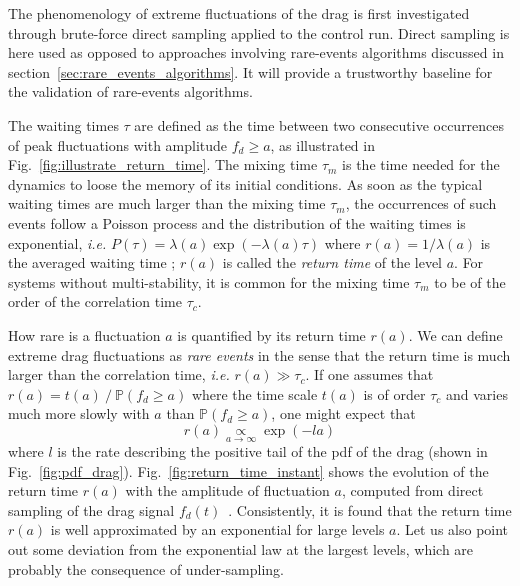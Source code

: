 \documentclass{jfm}
\begin{document}
%
The phenomenology of extreme fluctuations of the drag is first investigated through brute-force direct sampling applied to the control run.
Direct sampling is here used as opposed to approaches involving rare-events algorithms discussed in section~\ref{sec:rare_events_algorithms}.
It will provide a trustworthy baseline for the validation of rare-events algorithms. 

The waiting times $\tau$ are defined as the time between two consecutive occurrences of peak fluctuations with amplitude $f_d \geq a$, as illustrated in Fig.~\ref{fig:illustrate_return_time}.
The mixing time $\tau_m$ is the time needed for the dynamics to loose the memory of its initial conditions.
As soon as the typical waiting times are much larger than the mixing time $\tau_m$, the occurrences of such events follow a Poisson process and the distribution of the waiting times is exponential, \emph{i.e.} $P(\tau)=\lambda(a)\exp(-\lambda(a)\tau)$ where $r(a)=1/\lambda(a)$ is the averaged waiting time \citep{lestang_computing_2018}; $r(a)$ is called the {\it return time} of the level $a$.
For systems without multi-stability, it is common for the mixing time $\tau_m$ to be of the order of the correlation time $\tau_c$.

How rare is a fluctuation $a$ is quantified by its return time $r(a)$.
We can define extreme drag fluctuations as \textit{rare events} in the sense that the return time is much larger than the correlation time, \emph{i.e.} $r(a) \gg \tau_c$.
%
%
If one assumes that  $r(a) = t(a)~/~\mathbb{P}(f_d\geq a)$   where the time scale $t(a)$ is of order $\tau_c$ and varies much more slowly with $a$ than ${\mathbb{P}(f_d\geq a)}$,
one might expect that 
\begin{equation}
 \label{eq:return_time}
r(a) \underset{a\to\infty}{\propto} \exp(-la)
\end{equation}
where $l$ is the rate describing the positive tail of the \ac{pdf} of the drag (shown in Fig.~\ref{fig:pdf_drag}).
Fig.~\ref{fig:return_time_instant} shows the evolution of the return time $r(a)$ with the amplitude of fluctuation $a$, computed from {direct sampling} of the drag signal $f_d(t)$~\citep{lestang_computing_2018}.
Consistently, it is found that the return time $r(a)$ is well approximated by an exponential for large levels $a$. Let us also point out some deviation from the exponential law at the largest levels, which are probably the consequence of under-sampling.
\end{document}
